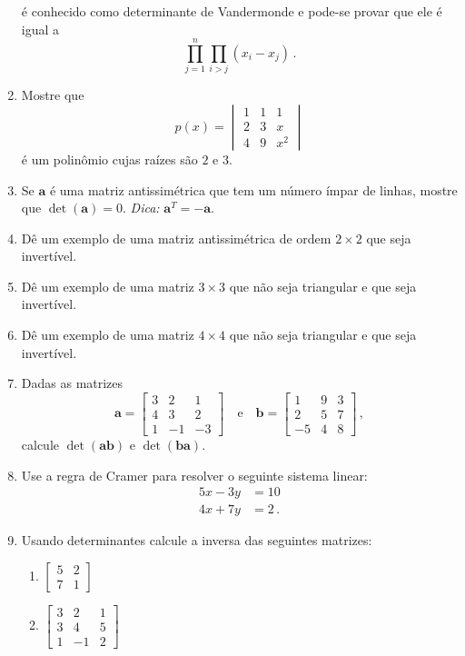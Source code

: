 \documentclass[12pt,a4paper]{article}
\newcommand{\mb}{\mathbf}
\begin{document}
\begin{enumerate}
é conhecido como determinante de Vandermonde e pode-se provar que ele é igual a $$\prod_{j=1}^n\prod_{i>j}(x_i-x_j)\,.$$
\item Mostre que 
$$p(x)=\begin{vmatrix}1&1&1\\2&3&x\\4&9&x^2\end{vmatrix}$$ é um polinômio cujas raízes são $2$ e $3$.
\item Se $\mb a$ é uma matriz antissimétrica que tem um número ímpar de linhas, mostre que $\det(\mb a)=0$. \textit{Dica:} $\mb a^T=-\mb a$.
\item Dê um exemplo de uma matriz antissimétrica de ordem $2\times 2$ que seja invertível.
\item Dê um exemplo de uma matriz $3\times 3$ que não seja triangular e que seja invertível.
\item Dê um exemplo de uma matriz $4\times 4$ que não seja triangular e que seja invertível.
\item Dadas as matrizes
$$\mb a=\begin{bmatrix} 3&2&1\\4&3&2\\1&-1&-3\end{bmatrix}\quad\text{e}\quad\mb b=\begin{bmatrix} 1&9&3\\2&5&7\\-5&4&8\end{bmatrix}\,,$$
calcule $\det(\mb{ab})$ e $\det(\mb{ba})$.
\item Use a regra de Cramer para resolver o seguinte sistema linear:
\begin{equation*}
\begin{split}
5x-3y&=10\\
4x+7y&=2\,.
\end{split}
\end{equation*}
\item Usando determinantes calcule a inversa das seguintes matrizes:
\begin{enumerate}
\item $\begin{bmatrix} 5&2\\7&1\end{bmatrix}$
\item $\begin{bmatrix} 3&2&1\\3&4&5\\1&-1&2\end{bmatrix}$
\end{enumerate}
\end{enumerate}
\end{document}
